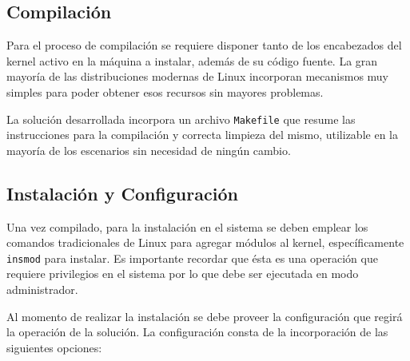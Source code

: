 \subsection{Compilación}
Para el proceso de compilación se requiere disponer tanto de los encabezados del kernel activo en la máquina a instalar, además de su código fuente. La gran mayoría de las distribuciones modernas de Linux incorporan mecanismos muy simples para poder obtener esos recursos sin mayores problemas.

La solución desarrollada incorpora un archivo \verb=Makefile= que resume las instrucciones para la compilación y correcta limpieza del mismo, utilizable en la mayoría de los escenarios sin necesidad de ningún cambio.

\subsection{Instalación y Configuración}
Una vez compilado, para la instalación en el sistema se deben emplear los comandos tradicionales de Linux para agregar módulos al kernel, específicamente \verb=insmod= para instalar. Es importante recordar que ésta es una operación que requiere privilegios en el sistema por lo que debe ser ejecutada en modo administrador.

Al momento de realizar la instalación se debe proveer la configuración que regirá la operación de la solución. La configuración consta de la incorporación de las siguientes opciones:

